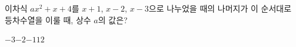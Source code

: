 이차식 $ax^2+x+4$를 $x+1$, $x-2$, $x-3$으로 나누었을 때의 나머지가 이 순서대로 등차수열을 이룰 때, 상수 $a$의 값은?
\begin{choices32}{$-3$}{$-2$}{$-1$}{$1$}{$2$}\end{choices32}
